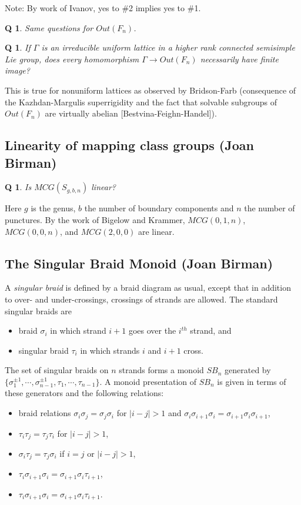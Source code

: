 \documentclass[11pt]{article}
\newtheorem{q}[thm]{Q}
\theoremstyle{remark}
\def\b{\begin{q}}
\def\e{\end{q}}
\newcommand{\<}{\langle}
\renewcommand{\>}{\rangle}
\begin{document}
Note: By work of Ivanov, yes to \#2 implies yes to \#1.

\b Same questions for $Out(F_n)$.\e

\b If $\Gamma$ is an irreducible uniform lattice in a higher rank connected
   semisimple Lie group, does every homomorphism $\Gamma\to Out(F_n)$
   necessarily have finite image?\e

This is true for nonuniform lattices as observed by Bridson-Farb (consequence
of the Kazhdan-Margulis superrigidity and the fact that solvable subgroups of
$Out(F_n)$ are virtually abelian [Bestvina-Feighn-Handel]).  


\subsection{Linearity of mapping class groups (Joan Birman)}
\b Is $MCG(S_{g,b,n})$ linear? \e
Here $g$ is the genus, $b$ the number of
boundary components and $n$ the number of punctures. By the work of Bigelow
and Krammer, $MCG(0,1,n)$, $MCG(0,0,n)$, and $MCG(2,0,0)$ are linear.


\subsection{The Singular Braid Monoid (Joan Birman)}
A {\it singular braid} is defined by a braid diagram as usual, except that in
addition to over- and under-crossings, crossings of strands are allowed. The
standard singular braids are
\begin{itemize}
\item braid $\sigma_i$ in which strand $i+1$ goes over the $i^{th}$ strand,
  and
\item singular braid $\tau_i$ in which strands $i$ and $i+1$ cross.
\end{itemize}

The set of singular braids on $n$ strands forms a monoid $SB_n$ generated by
$\{\sigma_1^{\pm 1},\cdots,\sigma_{n-1}^{\pm 1},\tau_1,\cdots,\tau_{n-1}\}$. A monoid
presentation of $SB_n$ is given in terms of these generators and the following
relations:
\begin{itemize}
\item braid relations $\sigma_i\sigma_j=\sigma_j\sigma_i$ for $|i-j|>1$ and
  $\sigma_i\sigma_{i+1}\sigma_i=\sigma_{i+1}\sigma_i\sigma_{i+1}$,
\item $\tau_i\tau_{j}=\tau_{j}\tau_i$ for $|i-j|>1$,
\item $\sigma_i\tau_j = \tau_j\sigma_i$ if $i=j$ or $|i-j|>1$,
\item $\tau_i\sigma_{i+1}\sigma_i=\sigma_{i+1}\sigma_i\tau_{i+1}$,
\item $\tau_i\sigma_{i+1}\sigma_i=\sigma_{i+1}\sigma_i\tau_{i+1}$.
\end{itemize}
\end{document}
